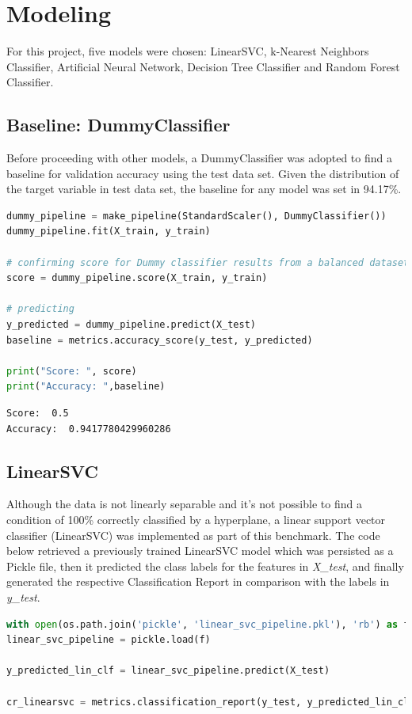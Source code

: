 \documentclass{article}
\begin{document}
\section{Modeling}

For this project, five models were chosen: LinearSVC, k-Nearest Neighbors Classifier, Artificial Neural Network, Decision Tree Classifier and Random Forest Classifier. 

\subsection{Baseline: DummyClassifier}
Before proceeding with other models, a DummyClassifier was adopted to find a baseline for validation accuracy using the test data set. Given the distribution of the target variable in test data set, the baseline for any model was set in 94.17\%.

\begin{lstlisting}[language=Python]
dummy_pipeline = make_pipeline(StandardScaler(), DummyClassifier())
dummy_pipeline.fit(X_train, y_train)

# confirming score for Dummy classifier results from a balanced dataset
score = dummy_pipeline.score(X_train, y_train)

# predicting
y_predicted = dummy_pipeline.predict(X_test)
baseline = metrics.accuracy_score(y_test, y_predicted)

print("Score: ", score)
print("Accuracy: ",baseline)
\end{lstlisting}
\begin{verbatim}
Score:  0.5
Accuracy:  0.9417780429960286
\end{verbatim}

\subsection{LinearSVC}
Although the data is not linearly separable and it's not possible to find a condition of 100\% correctly classified by a hyperplane, a linear support vector classifier (LinearSVC) was implemented as part of this benchmark. The code below retrieved a previously trained LinearSVC model which was persisted as a Pickle file, then it predicted the class labels for the features in \emph{X\_test}, and finally generated the respective Classification Report in comparison with the labels in \emph{y\_test}.

\begin{lstlisting}[language=Python]
with open(os.path.join('pickle', 'linear_svc_pipeline.pkl'), 'rb') as f:
linear_svc_pipeline = pickle.load(f)
    
y_predicted_lin_clf = linear_svc_pipeline.predict(X_test)    

cr_linearsvc = metrics.classification_report(y_test, y_predicted_lin_clf, digits=4)
\end{lstlisting}
\end{document}

